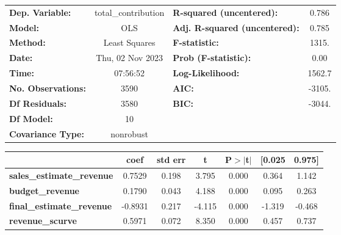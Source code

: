 \begin{center}
\begin{tabular}{lclc}
\toprule
\textbf{Dep. Variable:}                & total\_contribution & \textbf{  R-squared (uncentered):}      &     0.786   \\
\textbf{Model:}                        &         OLS         & \textbf{  Adj. R-squared (uncentered):} &     0.785   \\
\textbf{Method:}                       &    Least Squares    & \textbf{  F-statistic:       }          &     1315.   \\
\textbf{Date:}                         &   Thu, 02 Nov 2023  & \textbf{  Prob (F-statistic):}          &     0.00    \\
\textbf{Time:}                         &       07:56:52      & \textbf{  Log-Likelihood:    }          &    1562.7   \\
\textbf{No. Observations:}             &          3590       & \textbf{  AIC:               }          &    -3105.   \\
\textbf{Df Residuals:}                 &          3580       & \textbf{  BIC:               }          &    -3044.   \\
\textbf{Df Model:}                     &            10       & \textbf{                     }          &             \\
\textbf{Covariance Type:}              &      nonrobust      & \textbf{                     }          &             \\
\bottomrule
\end{tabular}
\begin{tabular}{lcccccc}
                                       & \textbf{coef} & \textbf{std err} & \textbf{t} & \textbf{P$> |$t$|$} & \textbf{[0.025} & \textbf{0.975]}  \\
\midrule
\textbf{sales\_estimate\_revenue}      &       0.7529  &        0.198     &     3.795  &         0.000        &        0.364    &        1.142     \\
\textbf{budget\_revenue}               &       0.1790  &        0.043     &     4.188  &         0.000        &        0.095    &        0.263     \\
\textbf{final\_estimate\_revenue}      &      -0.8931  &        0.217     &    -4.115  &         0.000        &       -1.319    &       -0.468     \\
\textbf{revenue\_scurve}               &       0.5971  &        0.072     &     8.350  &         0.000        &        0.457    &        0.737     \\

\end{tabular}
\end{center}

